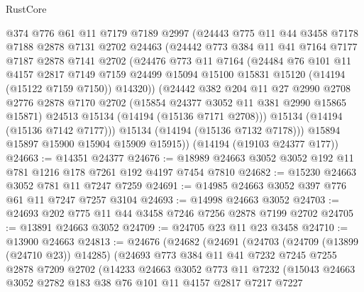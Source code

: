 \begin{lexlean}{RustCore}
\begin{coremodule}
        @374
        @776
        @61
        @11
        @7179
        @7189
        @2997
        (@24443
          @775
          @11
          @44
          @3458
          @7178
          @7188
          @2878
          @7131
          @2702
          @24463
          (@24442
            @773
            @384
            @11
            @41
            @7164
            @7177
            @7187
            @2878
            @7141
            @2702
            (@24476
              @773
              @11
              @7164
              (@24484
                @76
                @101
                @11
                @4157
                @2817
                @7149
                @7159
                @24499
                @15094
                @15100
                @15831
                @15120
                (@14194 (@15122 @7159 @7150))
                @14320))
            (@24442
              @382
              @204
              @11
              @27
              @2990
              @2708
              @2776
              @2878
              @7170
              @2702
              (@15854 @24377 @3052 @11 @381 @2990 @15865 @15871)
              @24513
              @15134
              (@14194 (@15136 @7171 @2708)))
            @15134
            (@14194 (@15136 @7142 @7177)))
          @15134
          (@14194 (@15136 @7132 @7178)))
        @15894
        @15897
        @15900
        @15904
        @15909
        @15915))
    (@14194 (@19103 @24377 @177))
@24663 := @14351 @24377
@24676 := @18989 @24663 @3052 @3052 @192 @11 @781 @1216 @178 @7261 @192 @4197 @7454 @7810
@24682 := @15230 @24663 @3052 @781 @11 @7247 @7259
@24691 := @14985 @24663 @3052 @397 @776 @61 @11 @7247 @7257 @3104
@24693 := @14998 @24663 @3052
@24703 := @24693 @202 @775 @11 @44 @3458 @7246 @7256 @2878 @7199 @2702
@24705 := @13891 @24663 @3052
@24709 := @24705 @23 @11 @23 @3458
@24710 := @13900 @24663
@24813 := @24676
    (@24682
      (@24691
        (@24703
          (@24709 (@13899 (@24710 @23)) @14285)
          (@24693
            @773
            @384
            @11
            @41
            @7232
            @7245
            @7255
            @2878
            @7209
            @2702
            (@14233
              @24663
              @3052
              @773
              @11
              @7232
              (@15043
                @24663
                @3052
                @2782
                @183
                @38
                @76
                @101
                @11
                @4157
                @2817
                @7217
                @7227

\end{coremodule}
\end{lexlean}
